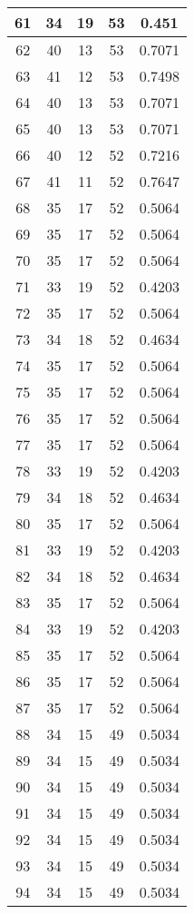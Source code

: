 \documentclass[letterpaper, 12pt]{article}
\begin{document}
\begin{longtable}{|c|c|c|c|c|}
\hline
61 & 34 & 19 & 53 & 0.451 \\
\hline
62 & 40 & 13 & 53 & 0.7071 \\
\hline
63 & 41 & 12 & 53 & 0.7498 \\
\hline
64 & 40 & 13 & 53 & 0.7071 \\
\hline
65 & 40 & 13 & 53 & 0.7071 \\
\hline
66 & 40 & 12 & 52 & 0.7216 \\
\hline
67 & 41 & 11 & 52 & 0.7647 \\
\hline
68 & 35 & 17 & 52 & 0.5064 \\
\hline
69 & 35 & 17 & 52 & 0.5064 \\
\hline
70 & 35 & 17 & 52 & 0.5064 \\
\hline
71 & 33 & 19 & 52 & 0.4203 \\
\hline
72 & 35 & 17 & 52 & 0.5064 \\
\hline
73 & 34 & 18 & 52 & 0.4634 \\
\hline
74 & 35 & 17 & 52 & 0.5064 \\
\hline
75 & 35 & 17 & 52 & 0.5064 \\
\hline
76 & 35 & 17 & 52 & 0.5064 \\
\hline
77 & 35 & 17 & 52 & 0.5064 \\
\hline
78 & 33 & 19 & 52 & 0.4203 \\
\hline
79 & 34 & 18 & 52 & 0.4634 \\
\hline
80 & 35 & 17 & 52 & 0.5064 \\
\hline
81 & 33 & 19 & 52 & 0.4203 \\
\hline
82 & 34 & 18 & 52 & 0.4634 \\
\hline
83 & 35 & 17 & 52 & 0.5064 \\
\hline
84 & 33 & 19 & 52 & 0.4203 \\
\hline
85 & 35 & 17 & 52 & 0.5064 \\
\hline
86 & 35 & 17 & 52 & 0.5064 \\
\hline
87 & 35 & 17 & 52 & 0.5064 \\
\hline
88 & 34 & 15 & 49 & 0.5034 \\
\hline
89 & 34 & 15 & 49 & 0.5034 \\
\hline
90 & 34 & 15 & 49 & 0.5034 \\
\hline
91 & 34 & 15 & 49 & 0.5034 \\
\hline
92 & 34 & 15 & 49 & 0.5034 \\
\hline
93 & 34 & 15 & 49 & 0.5034 \\
\hline
94 & 34 & 15 & 49 & 0.5034 \\

\end{longtable}
\end{document}

